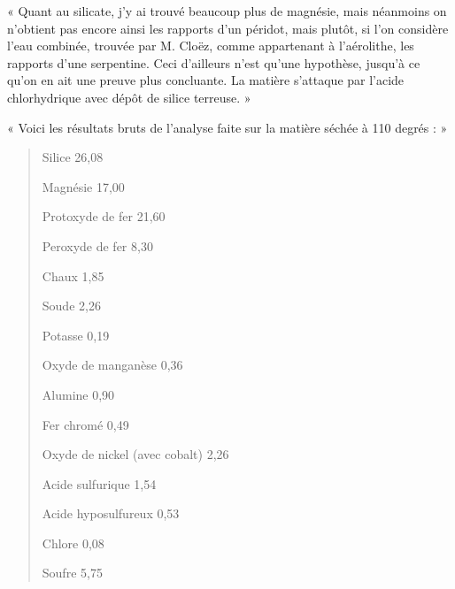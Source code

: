 \documentclass[a4paper, 11pt, oneside, polutonikogreek, french]{article}
\begin{document}
« Quant au silicate, j'y ai trouvé beaucoup plus de magnésie, mais néanmoins on n'obtient pas encore ainsi les rapports d'un péridot, mais plutôt, si l'on considère l'eau combinée, trouvée par M. Cloëz, comme appartenant à l'aérolithe, les rapports d'une serpentine. Ceci d'ailleurs n'est qu'une hypothèse, jusqu'à ce qu'on en ait une preuve plus concluante. La matière s'attaque par l'acide chlorhydrique avec dépôt de silice terreuse. »

« Voici les résultats bruts de l'analyse faite sur la matière séchée à 110 degrés : »
\begin{quotation}
Silice 26,08

Magnésie 17,00

Protoxyde de fer 21,60

Peroxyde de fer 8,30

Chaux 1,85

Soude 2,26

Potasse 0,19

Oxyde de manganèse 0,36

Alumine 0,90

Fer chromé 0,49

Oxyde de nickel (avec cobalt) 2,26

Acide sulfurique 1,54

Acide hyposulfureux 0,53

Chlore 0,08

Soufre 5,75
\end{quotation}
\end{document}

